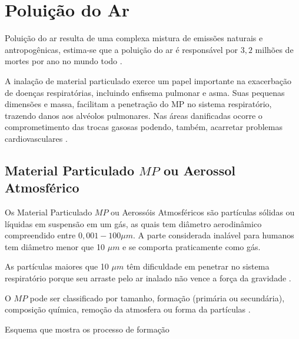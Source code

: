 \section{Poluição do Ar}

Poluição do ar resulta de uma complexa mistura de emissões naturais e 
antropogênicas, estima-se que a poluição do ar é responsável por 
$3,2$ milhões de mortes por ano no mundo todo \citep{lim2013}.

A inalação de material particulado exerce um papel importante na 
exacerbação de doenças respiratórias, incluindo enfisema pulmonar e asma. 
Suas pequenas dimensões e massa, facilitam a penetração do MP no sistema 
respiratório, trazendo danos aos alvéolos pulmonares. 
Nas áreas danificadas ocorre o comprometimento das 
trocas gasosas podendo, também, acarretar problemas cardiovasculares
\citep{arbex2012}.

\subsection{Material Particulado $MP$ ou Aerossol Atmosférico}

Os Material Particulado $MP$ ou  Aerossóis Atmosféricos são partículas
sólidas ou líquidas em suspensão em um gás, as quais tem diâmetro 
aerodinâmico compreendido  entre $0,001-100\mu m$. 
A parte considerada inalável para humanos tem diâmetro menor que 10 $\mu m$
e se comporta praticamente como gás.

As partículas maiores que 10 $\mu m$ têm dificuldade em penetrar 
no sistema respiratório porque seu arraste pelo ar inalado não vence 
a força da gravidade \citep{seinfeld1998}.

O $MP$ pode ser classificado por tamanho, formação 
(primária ou secundária), composição química, remoção da atmosfera ou 
forma da partículas \citep{seinfeld1998}.

Esquema que mostra os processo de formação 

